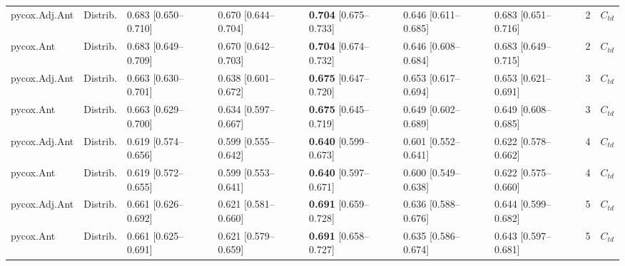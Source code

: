 \begin{tabular}{lllllllrl}
pycox.Adj.Ant & Distrib. & 0.683 [0.650–0.710] & 0.670 [0.644–0.704] & \textbf{0.704} [0.675–0.733] & 0.646 [0.611–0.685] & 0.683 [0.651–0.716] & 2 & $C_{td}$\\
pycox.Ant & Distrib. & 0.683 [0.649–0.709] & 0.670 [0.642–0.703] & \textbf{0.704} [0.674–0.732] & 0.646 [0.608–0.684] & 0.683 [0.649–0.715] & 2 & $C_{td}$\\
pycox.Adj.Ant & Distrib. & 0.663 [0.630–0.701] & 0.638 [0.601–0.672] & \textbf{0.675} [0.647–0.720] & 0.653 [0.617–0.694] & 0.653 [0.621–0.691] & 3 & $C_{td}$\\
\addlinespace
pycox.Ant & Distrib. & 0.663 [0.629–0.700] & 0.634 [0.597–0.667] & \textbf{0.675} [0.645–0.719] & 0.649 [0.602–0.689] & 0.649 [0.608–0.685] & 3 & $C_{td}$\\
pycox.Adj.Ant & Distrib. & 0.619 [0.574–0.656] & 0.599 [0.555–0.642] & \textbf{0.640} [0.599–0.673] & 0.601 [0.552–0.641] & 0.622 [0.578–0.662] & 4 & $C_{td}$\\
pycox.Ant & Distrib. & 0.619 [0.572–0.655] & 0.599 [0.553–0.641] & \textbf{0.640} [0.597–0.671] & 0.600 [0.549–0.638] & 0.622 [0.575–0.660] & 4 & $C_{td}$\\
pycox.Adj.Ant & Distrib. & 0.661 [0.626–0.692] & 0.621 [0.581–0.660] & \textbf{0.691} [0.659–0.728] & 0.636 [0.588–0.676] & 0.644 [0.599–0.682] & 5 & $C_{td}$\\
pycox.Ant & Distrib. & 0.661 [0.625–0.691] & 0.621 [0.579–0.659] & \textbf{0.691} [0.658–0.727] & 0.635 [0.586–0.674] & 0.643 [0.597–0.681] & 5 & $C_{td}$\\
\bottomrule
\end{tabular}
